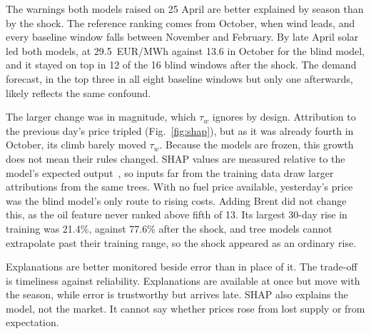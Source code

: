 The warnings both models raised on 25 April are better explained by season than by the shock. The reference ranking comes from October, when wind leads, and every baseline window falls between November and February. By late April solar led both models, at 29.5~EUR/MWh against 13.6 in October for the blind model, and it stayed on top in 12 of the 16 blind windows after the shock. The demand forecast, in the top three in all eight baseline windows but only one afterwards, likely reflects the same confound.

The larger change was in magnitude, which $\tau_w$ ignores by design. Attribution to the previous day's price tripled (Fig.~\ref{fig:shap}), but as it was already fourth in October, its climb barely moved $\tau_w$.
Because the models are frozen, this growth does not mean their rules changed. SHAP values are measured relative to the model's expected output~\cite{lundberg2020}, so inputs far from the training data draw larger attributions from the same trees. With no fuel price available, yesterday's price was the blind model's only route to rising costs. Adding Brent did not change this, as the oil feature never ranked above fifth of 13. Its largest 30-day rise in training was 21.4\%, against 77.6\% after the shock, and tree models cannot extrapolate past their training range, so the shock appeared as an ordinary rise.

Explanations are better monitored beside error than in place of it. The trade-off is timeliness against reliability. Explanations are available at once but move with the season, while error is trustworthy but arrives late. SHAP also explains the model, not the market. It cannot say whether prices rose from lost supply or from expectation.
